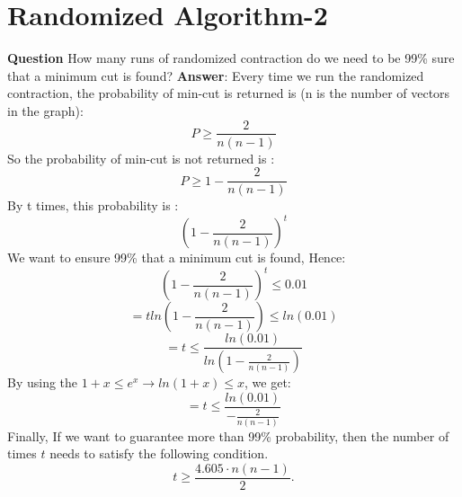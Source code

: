 \documentclass[12pt]{article}
\begin{document}
\section{Randomized Algorithm-2}
\textbf{Question}
How many runs of randomized contraction do we need to be 99\% sure that a minimum cut is found?
\textbf{Answer}:
Every time we run the randomized contraction, the probability of min-cut is returned is (n is the number of vectors in the graph):
\[P\geq\frac{2}{n(n-1)}\]
So the probability of min-cut is not returned is :
\[P\geq1-\frac{2}{n(n-1)}\]
By t times, this probability is :
\[(1-\frac{2}{n(n-1)})^t\]
We want to ensure 99\% that a minimum cut is found, Hence:
\[(1-\frac{2}{n(n-1)})^t\leq0.01\]
\[=tln(1-\frac{2}{n(n-1)})\leq ln(0.01)\]
\[=t\leq \frac{ln(0.01)}{ln(1-\frac{2}{n(n-1)})}\]
By using the \(1+x\leq e^x \rightarrow ln(1+x)\leq x\), we get:
\[=t\leq \frac{ln(0.01)}{-\frac{2}{n(n-1)}}\]
Finally, If we want to guarantee more than 99\% probability, then the number of times \(t\) needs to satisfy the following condition.
\[
t \geq \frac{4.605 \cdot n(n - 1)}{2}.
\]
\end{document}
